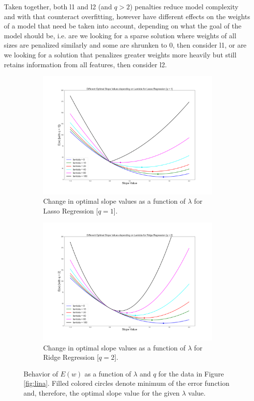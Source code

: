 \documentclass[11pt, a4paper]{article}
\begin{document}
Taken together, both l1 and l2 (and $q>2$) penalties reduce model complexity and with that counteract overfitting, however have different effects on the weights of a model that need be taken into account, depending on what the goal of the model should be, i.e. are we looking for a sparse solution where weights of all sizes are penalized similarly and some are shrunken to 0, then consider l1, or are we looking for a solution that penalizes greater weights more heavily but still retains information from all features, then consider l2. 
\begin{figure}[htb!]
	\centering
    \begin{subfigure}[b]{0.8\linewidth}
        \includegraphics[width=\linewidth]{lasso.png}
        \caption{Change in optimal slope values as a function of $\lambda$ for Lasso Regression [$q = 1$].}
        \label{fig:lasso}
    \end{subfigure}
    \begin{subfigure}[b]{0.8\linewidth}
        \includegraphics[width=\linewidth]{ridge.png}
        \caption{Change in optimal slope values as a function of $\lambda$ for Ridge Regression [$q = 2$].}
        \label{fig:ridge}
    \end{subfigure}
    \caption{Behavior of $E(w)$ as a function of $\lambda$ and $q$ for the data in Figure \ref{fig:lina}. Filled colored circles denote minimum of the error function and, therefore, the optimal slope value for the given $\lambda$ value.}
    \label{fig:lambda}
\end{figure}
\end{document}
